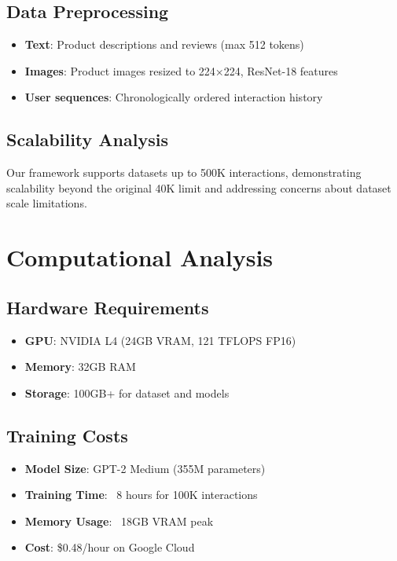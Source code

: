 \subsection{Data Preprocessing}
\begin{itemize}
    \item \textbf{Text}: Product descriptions and reviews (max 512 tokens)
    \item \textbf{Images}: Product images resized to 224×224, ResNet-18 features
    \item \textbf{User sequences}: Chronologically ordered interaction history
\end{itemize}

\subsection{Scalability Analysis}
Our framework supports datasets up to 500K interactions, demonstrating scalability beyond the original 40K limit and addressing concerns about dataset scale limitations.

\section{Computational Analysis}

\subsection{Hardware Requirements}
\begin{itemize}
    \item \textbf{GPU}: NVIDIA L4 (24GB VRAM, 121 TFLOPS FP16)
    \item \textbf{Memory}: 32GB RAM
    \item \textbf{Storage}: 100GB+ for dataset and models
\end{itemize}

\subsection{Training Costs}
\begin{itemize}
    \item \textbf{Model Size}: GPT-2 Medium (355M parameters)
    \item \textbf{Training Time}: ~8 hours for 100K interactions
    \item \textbf{Memory Usage}: ~18GB VRAM peak
    \item \textbf{Cost}: \$0.48/hour on Google Cloud
\end{itemize}

